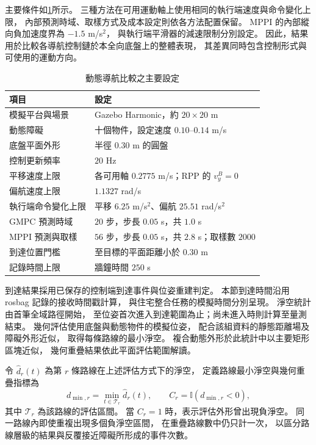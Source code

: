 主要條件如\cref{tab:ch4_navigation_settings}所示。
三種方法在可用運動軸上使用相同的執行端速度與命令變化上限，
內部預測時域、取樣方式及成本設定則依各方法配置保留。
MPPI 的內部縱向負加速度界為 $-1.5$ m/s$^2$，
與執行端平滑器的減速限制分別設定。
因此，結果用於比較各導航控制鏈於本全向底盤上的整體表現，
其差異同時包含控制形式與可使用的運動方向。

\begin{table}[htbp]
    \centering
    \caption{動態導航比較之主要設定}
    \label{tab:ch4_navigation_settings}
    \begingroup
    \small
    \renewcommand{\arraystretch}{1.2}
    \begin{tabular}{p{} p{}}
        \hline
        項目 & 設定 \\
        \hline
        模擬平台與場景 & Gazebo Harmonic，約 $20\times20$ m \\
        動態障礙 & 十個物件，設定速度 $0.10$--$0.14$ m/s \\
        底盤平面外形 & 半徑 $0.30$ m 的圓盤 \\
        控制更新頻率 & $20$ Hz \\
        平移速度上限 & 各可用軸 $0.2775$ m/s；RPP 的 $v_y^B=0$ \\
        偏航速度上限 & $1.1327$ rad/s \\
        執行端命令變化上限
        & 平移 $6.25$ m/s$^2$、偏航 $25.51$ rad/s$^2$ \\
        GMPC 預測時域 & $20$ 步，步長 $0.05$ s，共 $1.0$ s \\
        MPPI 預測與取樣 & $56$ 步，步長 $0.05$ s，共 $2.8$ s；取樣數 $2000$ \\
        到達位置門檻 & 至目標的平面距離小於 $0.30$ m \\
        記錄時間上限 & 牆鐘時間 $250$ s \\
        \hline
    \end{tabular}
    \endgroup
\end{table}

到達結果採用已保存的控制端到達事件與位姿重建判定。
本節到達時間沿用 rosbag 記錄的接收時間戳計算，
與住宅整合任務的模擬時間分別呈現。
淨空統計由首筆全域路徑開始，
至位姿首次進入到達範圍為止；尚未進入時則計算至量測結束。
幾何評估使用底盤與動態物件的模擬位姿，
配合該組資料的靜態距離場及障礙外形近似，
取得每條路線的最小淨空。
複合動態外形於此統計中以主要矩形區塊近似，
幾何重疊結果依此平面評估範圍解讀。

令 $\hat d_r(t)$ 為第 $r$ 條路線在上述評估方式下的淨空，
定義路線最小淨空與幾何重疊指標為
\begin{equation}
    d_{\min,r}=\min_{t\in\mathcal T_r}\hat d_r(t),
    \qquad
    C_r=\mathbb I(d_{\min,r}<0),
    \label{eq:ch4_navigation_overlap_indicator}
\end{equation}
其中 $\mathcal T_r$ 為該路線的評估區間。
當 $C_r=1$ 時，表示評估外形曾出現負淨空。
同一路線內即使重複出現多個負淨空區間，
在重疊路線數中仍只計一次，
以區分路線層級的結果與反覆接近障礙所形成的事件次數。

